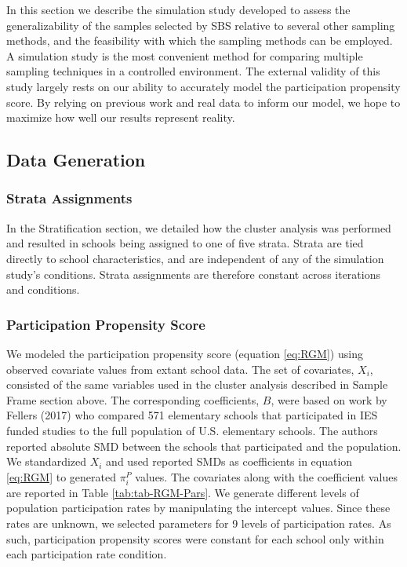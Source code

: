 \documentclass[
  english,
  man,floatsintext]{apa6}
\begin{document}
In this section we describe the simulation study developed to assess the generalizability of the samples selected by SBS relative to several other sampling methods, and the feasibility with which the sampling methods can be employed. A simulation study is the most convenient method for comparing multiple sampling techniques in a controlled environment. The external validity of this study largely rests on our ability to accurately model the participation propensity score. By relying on previous work and real data to inform our model, we hope to maximize how well our results represent reality.

\hypertarget{data-generation}{%
\subsection{Data Generation}\label{data-generation}}

\hypertarget{strata-assignments}{%
\subsubsection{Strata Assignments}\label{strata-assignments}}

In the Stratification section, we detailed how the cluster analysis was performed and resulted in schools being assigned to one of five strata. Strata are tied directly to school characteristics, and are independent of any of the simulation study's conditions. Strata assignments are therefore constant across iterations and conditions.

\hypertarget{participation-propensity-score}{%
\subsubsection{Participation Propensity Score}\label{participation-propensity-score}}

We modeled the participation propensity score (equation \eqref{eq:RGM}) using observed covariate values from extant school data. The set of covariates, \(X_i\), consisted of the same variables used in the cluster analysis described in Sample Frame section above. The corresponding coefficients, \(B\), were based on work by Fellers (2017) who compared 571 elementary schools that participated in IES funded studies to the full population of U.S. elementary schools. The authors reported absolute SMD between the schools that participated and the population. We standardized \(X_i\) and used reported SMDs as coefficients in equation \eqref{eq:RGM} to generated \(\pi^P_i\) values. The covariates along with the coefficient values are reported in Table \ref{tab:tab-RGM-Pars}. We generate different levels of population participation rates by manipulating the intercept values. Since these rates are unknown, we selected parameters for 9 levels of participation rates. As such, participation propensity scores were constant for each school only within each participation rate condition.
\end{document}
